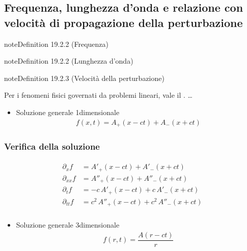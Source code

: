 \documentclass[letterpaper,10pt,italian]{jupyterBook}
\begin{document}
\subsection{Frequenza, lunghezza d’onda e relazione con velocità di propagazione della perturbazione}
\label{\detokenize{ch/waves/intro:frequenza-lunghezza-d-onda-e-relazione-con-velocita-di-propagazione-della-perturbazione}}\label{ch/waves/intro:wave-length}
\begin{sphinxadmonition}{note}{Definition 19.2.2 (Frequenza)}


\end{sphinxadmonition}
\label{ch/waves/intro:wave-length}
\begin{sphinxadmonition}{note}{Definition 19.2.2 (Lunghezza d’onda)}


\end{sphinxadmonition}
\label{ch/waves/intro:wave-speed}
\begin{sphinxadmonition}{note}{Definition 19.2.3 (Velocità della perturbazione)}


\end{sphinxadmonition}

\sphinxAtStartPar
Per i fenomeni fisici governati da problemi lineari, vale il . …
\begin{itemize}
\item {} 
\sphinxAtStartPar
Soluzione generale 1\sphinxhyphen{}dimensionale
\begin{equation*}
\begin{split}f(x,t) = A_{+}(x - c t) + A_{-}(x + ct)\end{split}
\end{equation*}
\end{itemize}
\subsubsection*{Verifica della soluzione}
\begin{equation*}
\begin{split}\begin{aligned}
\partial_x    f & = A'_+(x-ct) + A'_-(x+ct) \\
\partial_{xx} f & = A''_+(x-ct) + A''_-(x+ct) \\
\partial_t    f & = - c \, A'_+(x-ct) + c \, A'_-(x+ct) \\
\partial_{tt} f & = c^2 \, A''_+(x-ct) + c^2 \,  A''_-(x+ct) \\
\end{aligned}\end{split}
\end{equation*}\begin{itemize}
\item {} 
\sphinxAtStartPar
Soluzione generale 3\sphinxhyphen{}dimensionale
\begin{equation*}
\begin{split}f(r,t) = \dfrac{A(r-ct)}{r}\end{split}
\end{equation*}
\end{itemize}
\end{document}
